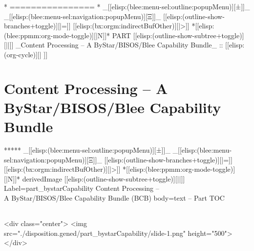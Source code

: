 \begin{whenOrg}
\begin{frame}[fragile,plain,label=obtainingPolyBook]
\end{frame}


\begin{whenOrg}
*      ================
*  _[[elisp:(blee:menu-sel:outline:popupMenu)][±]]_ _[[elisp:(blee:menu-sel:navigation:popupMenu)][Ξ]]_ [[elisp:(outline-show-branches+toggle)][|=]] [[elisp:(bx:orgm:indirectBufOther)][|>]] *[[elisp:(blee:ppmm:org-mode-toggle)][|N]]*  PART       [[elisp:(outline-show-subtree+toggle)][||]]   _Content Processing -- A ByStar/BISOS/Blee Capability Bundle_ ::  [[elisp:(org-cycle)][| ]]
\end{whenOrg}

\newpage
\part{Content Processing -- A ByStar/BISOS/Blee Capability Bundle}


\begin{whenOrg}
*****  _[[elisp:(blee:menu-sel:outline:popupMenu)][±]]_ _[[elisp:(blee:menu-sel:navigation:popupMenu)][Ξ]]_ [[elisp:(outline-show-branches+toggle)][|=]] [[elisp:(bx:orgm:indirectBufOther)][|>]] *[[elisp:(blee:ppmm:org-mode-toggle)][|N]]*  derivedImage [[elisp:(outline-show-subtree+toggle)][||]] Label=part_bystarCapability Content Processing --\\ A ByStar/BISOS/Blee Capability Bundle (BCB) body=text -- Part TOC
\end{whenOrg}

\begin{htmlonly}

\begin{frame}[fragile,plain,label=part_bystarCapability]
    \frametitle{}
    \framesubtitle{}
    \begin{rawhtml}
<div class="center">
<img src="./disposition.gened/part_bystarCapability/slide-1.png" height="500">
</div>
    \end{rawhtml}
\end{frame}
\end{htmlonly}


\end{whenOrg}
